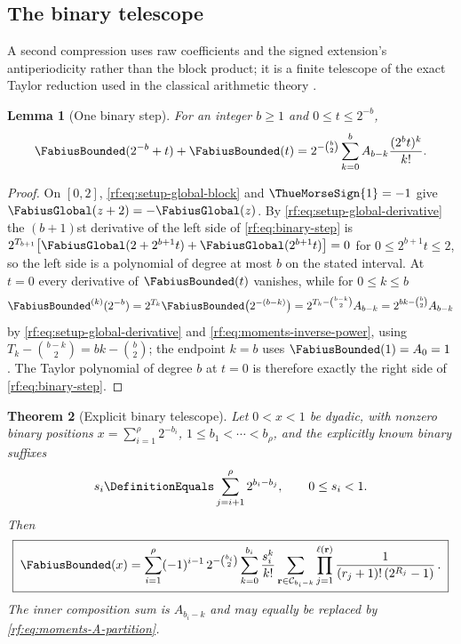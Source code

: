 \documentclass[11pt,oneside]{article}
\theoremstyle{plain}
\newtheorem{theorem}{Theorem}[section]
\newtheorem{lemma}[theorem]{Lemma}
\theoremstyle{definition}
\theoremstyle{remark}
\newcommand{\Fb}{\FabiusBounded}            %
\newcommand{\Fg}{\FabiusGlobal}             %
\newcommand{\tm}[1]{\ThueMorseSign{#1}}     %
\newcommand{\Comp}[1]{\mathcal{C}_{#1}}     %
\newcommand{\Tr}[1]{T_{#1}}                 %
\begin{document}
\subsection{The binary telescope}
\label{rf:sec:binary-telescope}

A second compression uses raw coefficients and the signed extension's
antiperiodicity rather than the block product; it is a finite telescope of
the exact Taylor reduction used in the classical arithmetic theory
\cite{arias2018}.

\begin{lemma}[One binary step]
\label{rf:lem:binary-step}
For an integer $b\ge1$ and $0\le t\le2^{-b}$,
\begin{equation}
 \Fb(2^{-b}+t)+\Fb(t)=2^{-\binom{b}{2}}\sum_{k=0}^{b}A_{b-k}\frac{(2^{b}t)^{k}}{k!}.
 \label{rf:eq:binary-step}
\end{equation}
\end{lemma}

\begin{proof}
On $[0,2]$, \cref{rf:eq:setup-global-block} and $\tm{1}=-1$ give
$\Fg(z+2)=-\Fg(z)$.  By \cref{rf:eq:setup-global-derivative} the
$(b+1)$st derivative of the left side of \cref{rf:eq:binary-step} is
$2^{\Tr{b+1}}\bigl[\Fg(2+2^{b+1}t)+\Fg(2^{b+1}t)\bigr]=0$ for
$0\le2^{b+1}t\le2$, so the left side is a polynomial of degree at most $b$
on the stated interval.  At $t=0$ every derivative of $\Fb(t)$ vanishes,
while for $0\le k\le b$
\[
 \Fb^{(k)}(2^{-b})=2^{\Tr{k}}\Fb\bigl(2^{-(b-k)}\bigr)
 =2^{\Tr{k}-\binom{b-k}{2}}A_{b-k}=2^{bk-\binom{b}{2}}A_{b-k}
\]
by \cref{rf:eq:setup-global-derivative} and
\cref{rf:eq:moments-inverse-power}, using
$\Tr{k}-\binom{b-k}{2}=bk-\binom{b}{2}$; the endpoint $k=b$ uses
$\Fb(1)=A_{0}=1$.  The Taylor polynomial of degree $b$ at $t=0$ is therefore
exactly the right side of \cref{rf:eq:binary-step}.
\end{proof}

\begin{theorem}[Explicit binary telescope]
\label{rf:thm:binary-telescope}
Let $0<x<1$ be dyadic, with nonzero binary positions
$x=\sum_{i=1}^{\rho}2^{-b_{i}}$, $1\le b_{1}<\cdots<b_{\rho}$, and the
explicitly known binary suffixes
\begin{equation}
 s_{i}\DefinitionEquals\sum_{j=i+1}^{\rho}2^{b_{i}-b_{j}},\qquad0\le s_{i}<1.
 \label{rf:eq:binary-suffix}
\end{equation}
Then
\begin{equation}
 \boxed{\;
 \Fb(x)=\sum_{i=1}^{\rho}(-1)^{i-1}\,2^{-\binom{b_{i}}{2}}
 \sum_{k=0}^{b_{i}}\frac{s_{i}^{k}}{k!}
 \sum_{\mathbf r\in\Comp{b_{i}-k}}\prod_{j=1}^{\ell(\mathbf r)}
 \frac{1}{(r_{j}+1)!\,(2^{R_{j}}-1)}\,.\;}
 \label{rf:eq:binary-telescope}
\end{equation}
The inner composition sum is $A_{b_{i}-k}$ and may equally be replaced by
\cref{rf:eq:moments-A-partition}.
\end{theorem}
\end{document}
